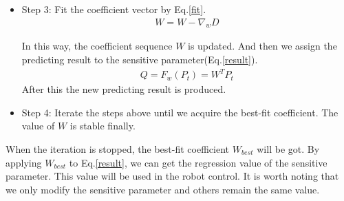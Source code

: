 \begin{itemize}
	\item Step 3: Fit the coefficient vector by Eq.\ref{fit}.
	\begin{eqnarray}\label{fit}
	W=W-\nabla_{w}D
	\end{eqnarray}
	
	In this way, the coefficient sequence $W$ is updated. And then we assign the predicting result to the sensitive parameter(Eq.\ref{result}).
	\begin{eqnarray}\label{result}
	Q=F_{w}(P_{t})=W^{T}P_{t}
	\end{eqnarray}
	After this the new predicting result is produced.
	
	\item Step 4: Iterate the steps above until we acquire the best-fit coefficient. The value of $W$ is stable finally.
\end{itemize}

When the iteration is stopped, the best-fit coefficient $W_{best}$ will be got. By applying $W_{best}$ to Eq.\ref{result}, we can get the regression value of the sensitive parameter. This value will be used in the robot control. It is worth noting that we only modify the sensitive parameter and others remain the same value.
